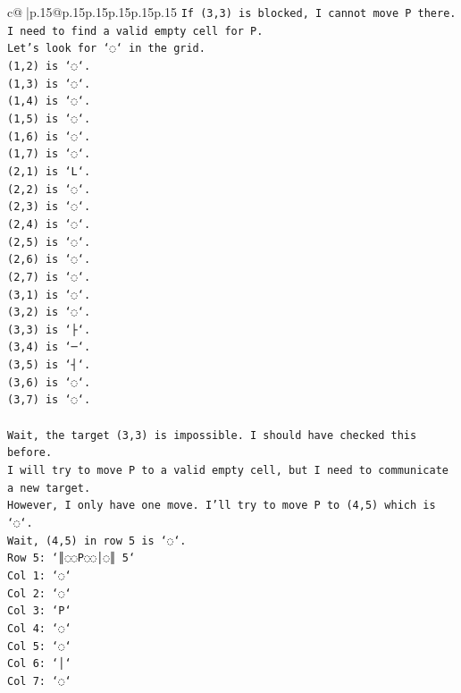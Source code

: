 \documentclass{article}
\begin{document}
{\begin{supertabular}{c@{$\;$}|p{.15\linewidth}@{}p{.15\linewidth}p{.15\linewidth}p{.15\linewidth}p{.15\linewidth}p{.15\linewidth}}
{{{\texttt{If (3,3) is blocked, I cannot move P there.} \\
\texttt{I need to find a valid empty cell for P.} \\
\texttt{Let's look for `◌` in the grid.} \\
\texttt{(1,2) is `◌`.} \\
\texttt{(1,3) is `◌`.} \\
\texttt{(1,4) is `◌`.} \\
\texttt{(1,5) is `◌`.} \\
\texttt{(1,6) is `◌`.} \\
\texttt{(1,7) is `◌`.} \\
\texttt{(2,1) is `L`.} \\
\texttt{(2,2) is `◌`.} \\
\texttt{(2,3) is `◌`.} \\
\texttt{(2,4) is `◌`.} \\
\texttt{(2,5) is `◌`.} \\
\texttt{(2,6) is `◌`.} \\
\texttt{(2,7) is `◌`.} \\
\texttt{(3,1) is `◌`.} \\
\texttt{(3,2) is `◌`.} \\
\texttt{(3,3) is `├`.} \\
\texttt{(3,4) is `─`.} \\
\texttt{(3,5) is `┤`.} \\
\texttt{(3,6) is `◌`.} \\
\texttt{(3,7) is `◌`.} \\
\\ 
\texttt{Wait, the target (3,3) is impossible. I should have checked this before.} \\
\texttt{I will try to move P to a valid empty cell, but I need to communicate a new target.} \\
\texttt{However, I only have one move. I'll try to move P to (4,5) which is `◌`.} \\
\texttt{Wait, (4,5) in row 5 is `◌`.} \\
\texttt{Row 5: `║◌◌P◌◌│◌║ 5`} \\
\texttt{Col 1: `◌`} \\
\texttt{Col 2: `◌`} \\
\texttt{Col 3: `P`} \\
\texttt{Col 4: `◌`} \\
\texttt{Col 5: `◌`} \\
\texttt{Col 6: `│`} \\
\texttt{Col 7: `◌`} \\
}}}
\end{supertabular}}
\end{document}
